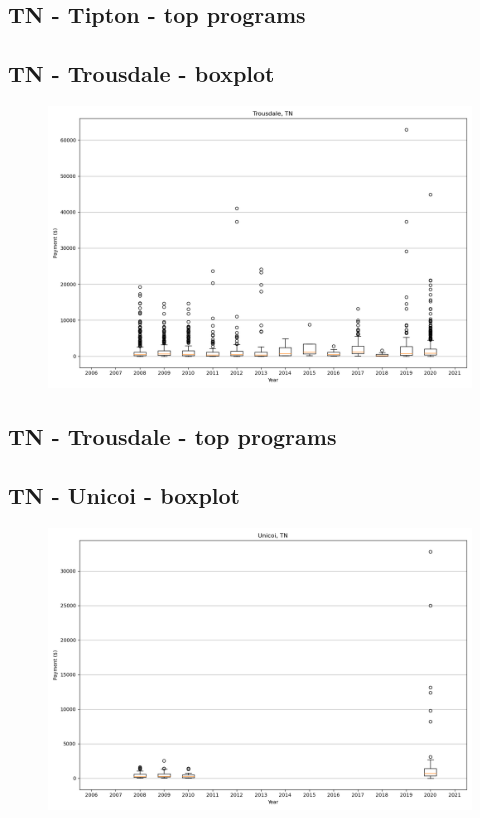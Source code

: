 \subsection*{TN - Tipton - top programs}

\newpage
\subsection*{TN - Trousdale - boxplot}
\begin{figure}[h]
\centering
\includegraphics[width=7in]{../output/boxplots/counties/Trousdale-TN_boxplot.png}
\end{figure}


\subsection*{TN - Trousdale - top programs}

\newpage
\subsection*{TN - Unicoi - boxplot}
\begin{figure}[h]
\centering
\includegraphics[width=7in]{../output/boxplots/counties/Unicoi-TN_boxplot.png}
\end{figure}


